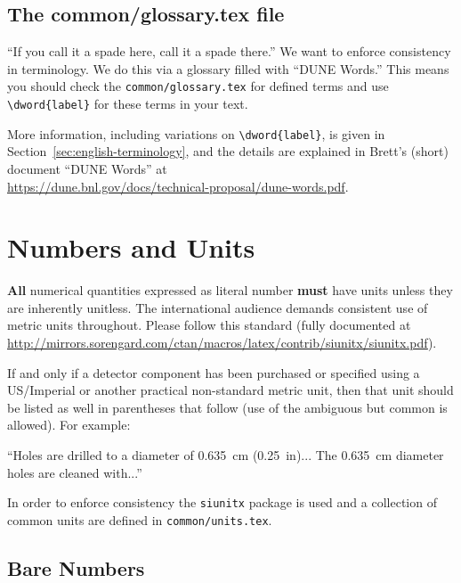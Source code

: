 \subsection{The common/glossary.tex file}

``If you call it a spade here, call it a spade there.'' We want to enforce consistency in terminology. We do this via a glossary filled with ``DUNE Words.''  This means you should check the \verb|common/glossary.tex| for defined terms and use \verb|\dword{label}| for these terms in your text.

 More information, including variations on \verb|\dword{label}|, is given in Section~\ref{sec:english-terminology}, and the details are explained in Brett's (short) document ``DUNE Words'' at \\
 \url{https://dune.bnl.gov/docs/technical-proposal/dune-words.pdf}.



\section{Numbers and Units}
\label{sec:num-units}

\textbf{All} numerical quantities expressed as literal number
\textbf{must} have units unless they are inherently unitless.
The international audience demands consistent use of metric units throughout.  Please follow this standard (fully documented at \url{http://mirrors.sorengard.com/ctan/macros/latex/contrib/siunitx/siunitx.pdf}). 

If and only if  a detector component has been purchased or specified using a US/Imperial or another practical non-standard metric unit, then that unit should be listed as well in parentheses that follow (use of the ambiguous but common \si{\kt} is allowed). For example:

``Holes are drilled to a diameter of \SI{0.635}{cm} (\SI{0.25}{in})... The \SI{0.635}{cm} diameter holes are cleaned with...''

In order to enforce consistency the \texttt{siunitx} package is used
and a collection of common units are defined in
\texttt{common/units.tex}.


\subsection{Bare Numbers}

